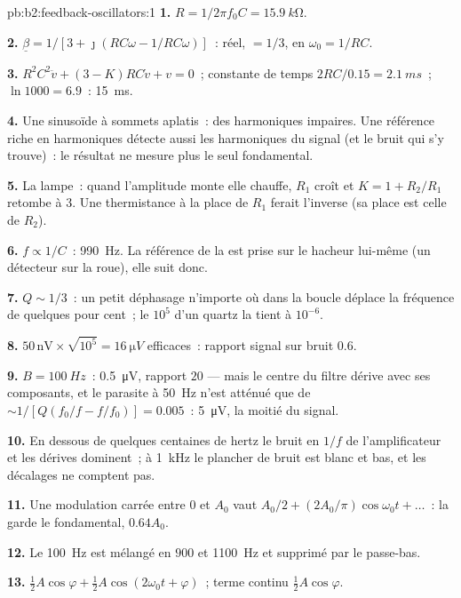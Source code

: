 \begin{solution}{pb:b2:feedback-oscillators:1}
\textbf{1.} $R = 1/2\pi f_0C = \qty{15.9}{k\ohm}$.

\textbf{2.} $\underline\beta = 1/[3 + \jmath(RC\omega - 1/RC\omega)]$~: réel, $= 1/3$, en
$\omega_0 = 1/RC$.

\textbf{3.} $R^2C^2\ddot v + (3 - K)RC\dot v + v = 0$~; constante de temps $2RC/0.15 =
\qty{2.1}{ms}$~; $\ln1000 = 6.9$~: \qty{15}{ms}.

\textbf{4.} Une sinusoïde à sommets aplatis~: des harmoniques impaires. Une référence riche
en harmoniques détecte aussi les harmoniques du signal (et le bruit qui s'y trouve)~:
le résultat ne mesure plus le seul fondamental.

\textbf{5.} La lampe~: quand l'amplitude monte elle chauffe, $R_1$ croît et
$K = 1 + R_2/R_1$ retombe à $3$. Une thermistance à la place de $R_1$ ferait
l'inverse (sa place est celle de $R_2$).

\textbf{6.} $f \propto 1/C$~: \qty{990}{Hz}. La référence de la  est prise sur
le hacheur lui-même (un détecteur sur la roue), elle suit donc.

\textbf{7.} $Q \sim 1/3$~: un petit déphasage n'importe où dans la boucle déplace la
fréquence de quelques pour cent~; le $10^5$ d'un quartz la tient à $10^{-6}$.

\textbf{8.} $50\,\text{nV} \times \sqrt{10^5} = \qty{16}{\micro V}$ efficaces~: rapport signal sur bruit $0.6$.

\textbf{9.} $B = \qty{100}{Hz}$~: \qty{0.5}{\micro V}, rapport $20$ --- mais le centre du filtre
dérive avec ses composants, et le parasite à \qty{50}{Hz} n'est
atténué que de $\sim 1/[Q(f_0/f - f/f_0)] = 0.005$~: \qty{5}{\micro V}, la moitié du
signal.

\textbf{10.} En dessous de quelques centaines de hertz le bruit en $1/f$ de l'amplificateur et
les dérives dominent~; à \qty{1}{kHz} le plancher de bruit est blanc et bas, et
les décalages ne comptent pas.

\textbf{11.} Une modulation carrée entre $0$ et $A_0$ vaut $A_0/2 + (2A_0/\pi)
\cos\omega_0t + \dots$~: la  garde le fondamental, $0.64A_0$.

\textbf{12.} Le \qty{100}{Hz} est mélangé en $900$ et \qty{1100}{Hz} et supprimé par
le passe-bas.

\textbf{13.} $\tfrac12A\cos\varphi + \tfrac12A\cos(2\omega_0t + \varphi)$~; terme continu $\tfrac12A\cos\varphi$.


\end{solution}
